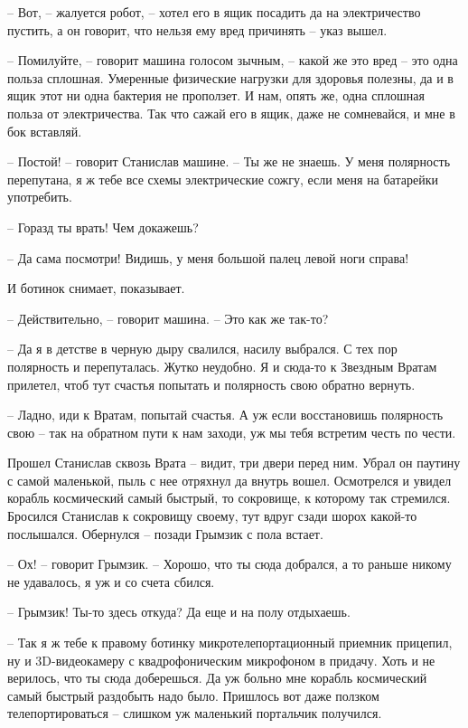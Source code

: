 \documentclass[ebook,oneside,final,openright]{memoir}
\begin{document}
– Вот, – жалуется робот, – хотел его в ящик посадить да на электричество пустить, а он говорит, что нельзя ему вред причинять – указ вышел. \par
– Помилуйте, – говорит машина голосом зычным, – какой же это вред – это одна польза сплошная. Умеренные физические нагрузки для здоровья полезны, да и в ящик этот ни одна бактерия не проползет. И нам, опять же, одна сплошная польза от электричества. Так что сажай его в ящик, даже не сомневайся, и мне в бок вставляй. \par
– Постой! – говорит Станислав машине. – Ты же не знаешь. У меня полярность перепутана, я ж тебе все схемы электрические сожгу, если меня на батарейки употребить. \par
– Горазд ты врать! Чем докажешь? \par
– Да сама посмотри! Видишь, у меня большой палец левой ноги справа! \par
И ботинок снимает, показывает. \par
– Действительно, – говорит машина. – Это как же так-то? \par
– Да я в детстве в черную дыру свалился, насилу выбрался. С тех пор полярность и перепуталась. Жутко неудобно. Я и сюда-то к Звездным Вратам прилетел, чтоб тут счастья попытать и полярность свою обратно вернуть. \par
– Ладно, иди к Вратам, попытай счастья. А уж если восстановишь полярность свою – так на обратном пути к нам заходи, уж мы тебя встретим честь по чести.\par
\par
Прошел Станислав сквозь Врата – видит, три двери перед ним. Убрал он паутину с самой маленькой, пыль с нее отряхнул да внутрь вошел. Осмотрелся и увидел корабль космический самый быстрый, то сокровище, к которому так стремился. Бросился Станислав к сокровищу своему, тут вдруг сзади шорох какой-то послышался. Обернулся – позади Грымзик с пола встает.\par
– Ох! – говорит Грымзик. – Хорошо, что ты сюда добрался, а то раньше никому не удавалось, я уж и со счета сбился.\par
– Грымзик! Ты-то здесь откуда? Да еще и на полу отдыхаешь.\par
– Так я ж тебе к правому ботинку микротелепортационный приемник прицепил, ну и 3D-видеокамеру с квадрофоническим микрофоном в придачу. Хоть и не верилось, что ты сюда доберешься. Да уж больно мне корабль космический самый быстрый раздобыть надо было. Пришлось вот даже ползком телепортироваться – слишком уж маленький портальчик получился.\par
\end{document}
